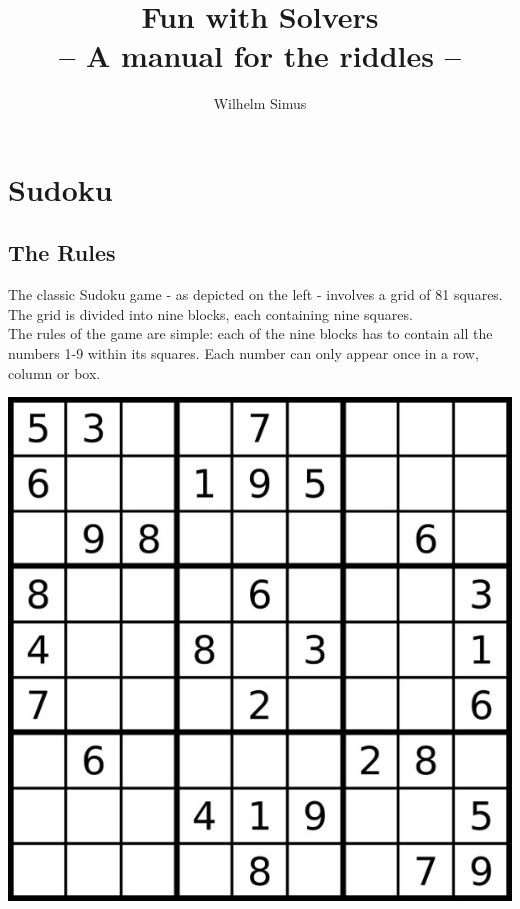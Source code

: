 \documentclass[12pt]{article}
\title{Fun with Solvers \\ \large -- A manual for the riddles --}
\author{Wilhelm Simus}
\begin{document}
	\maketitle
	\thispagestyle{empty}
	\newpage
	
	\section*{Sudoku}
	
	\subsection*{The Rules}
	
	\begin{minipage}[t]{0.55\linewidth}
		\strut\vspace*{-\baselineskip}\newline		
		The classic Sudoku game - as depicted on the left - involves a grid of 81 squares. The grid is divided into nine blocks, each containing nine squares.\\
		
		The rules of the game are simple: each of the nine blocks has to contain all the numbers 1-9 within its squares. Each number can only appear once in a row, column or box.
	\end{minipage}
	\hspace*{0.1\linewidth}
	\begin{minipage}[t]{0.35\linewidth}
		\strut\vspace*{-\baselineskip}\newline 
		\includegraphics[width = \linewidth]{img/sudoku.jpg}
	\end{minipage}
	
\end{document}
